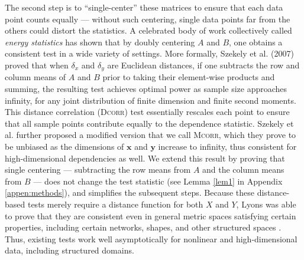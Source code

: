 \documentclass[11pt]{article}
\providecommand{\sct}[1]{{\normalfont\textsc{#1}}}
\providecommand{\mb}[1]{\boldsymbol{#1}}
\newcommand{\Dcorr}{\sct{Dcorr}}
\newcommand{\Mcorr}{\sct{Mcorr}}
\begin{document}
The second step is to ``single-center'' these matrices to ensure that each data point counts equally --- without such centering, single data points far from the others could distort the statistics.
A celebrated body of  work collectively called \emph{energy statistics} \cite{RizzoSzekely2016} has shown that by doubly centering $A$ and $B$, one obtains a consistent test in a wide variety of settings.  
More formally, Szekely et al. (2007) \cite{SzekelyRizzoBakirov2007} proved that when  $\delta_x$ and $\delta_y$  are  Euclidean distances, if one subtracts the row and column means of $A$ and $B$ prior to taking their element-wise products and summing, the resulting test achieves optimal power as 
sample size approaches infinity, for any joint distribution of finite dimension and finite second moments. 
This distance correlation (\Dcorr) test essentially rescales each point to ensure that all sample points contribute equally to the dependence statistic. 
Szekely et al. \cite{SzekelyRizzo2013a} further proposed a modified version that we call \Mcorr, which they prove to be unbiased as the dimensions of $\mb{x}$ and $\mb{y}$ increase to infinity, thus consistent for high-dimensional dependencies as well.
We extend this result by proving that single centering --- subtracting the row means from $A$ and the column means from $B$ --- does not change the test statistic (see Lemma \ref{lem1} in Appendix \ref{appen:methods}), and simplifies the subsequent steps.
Because these distance-based tests merely require a distance function for both $X$ and $Y$, Lyons was able to prove that they are consistent even in general metric spaces satisfying certain properties, including certain networks, shapes, and other structured spaces  \cite{Lyons2013}.
Thus, existing tests  work well asymptotically for nonlinear and high-dimensional data,  including structured domains. 
\end{document}

